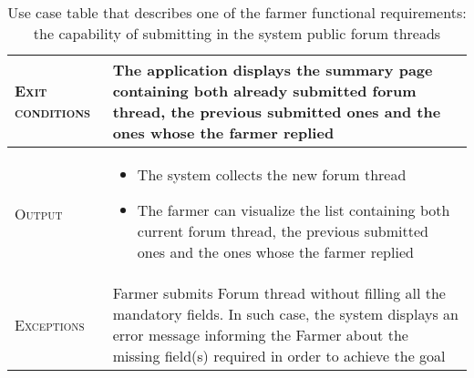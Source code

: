 \begin{table}[H]
\begin{tabular}{|l|p{}|}
        \hline %
        \textsc{Exit conditions}    &  The application displays the summary page containing both already submitted forum thread, the previous submitted ones and the ones whose the farmer replied\\
    	\hline %
    	\textsc{Output}             &  \begin{itemize}
    	    \item The system collects the new forum thread
    	    \item The farmer can visualize the list containing both current forum thread, the previous submitted ones and the ones whose the farmer replied
    	\end{itemize}\\
    	\hline %
    	\textsc{Exceptions}         &   Farmer submits Forum thread without filling all the mandatory fields. In such case, the system displays an error message informing the Farmer about the missing field(s) required in order to achieve the goal\\
    	\hline %
        
    \end{tabular}

\caption{\label{tab:Forum_generation}Use case table that describes one of the farmer functional requirements: the capability of submitting in the system public forum threads}
\end{table}



